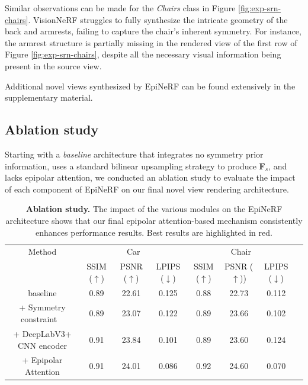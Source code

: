 Similar observations can be made for the \textit{Chairs} class in Figure \ref{fig:exp-srn-chairs}. VisionNeRF struggles to fully synthesize the intricate geometry of the back and armrests, failing to capture the chair's inherent symmetry. For instance, the armrest structure is partially missing in the rendered view of the first row of Figure \ref{fig:exp-srn-chairs}, despite all the necessary visual information being present in the source view. \newline

Additional novel views synthesized by EpiNeRF can be found extensively in the supplementary material.

\subsection{Ablation study}
Starting with a \textit{baseline} architecture that integrates no symmetry prior information, uses a standard bilinear upsampling strategy to produce $\mathbf{F}_{s}$, and lacks epipolar attention, we conducted an ablation study to evaluate the impact of each component of EpiNeRF on our final novel view rendering architecture.

\begin{table}[htp!]
\caption{\textbf{Ablation study.} The impact of the various modules on the EpiNeRF architecture shows that our final epipolar attention-based mechanism consistently enhances performance results. Best results are highlighted in \colorbox{red!25}{red}.}
\label{tab:ablation}
\begin{center}
\centering
\begin{adjustbox}{width=.5\textwidth}
\begin{tabular}[h]{c||ccccccc}
\hline
Method & \multicolumn{3}{c}{Car} & \multicolumn{3}{c}{Chair} \\
 &  SSIM ($\uparrow$) & PSNR ($\uparrow$) & LPIPS ($\downarrow$) & SSIM ($\uparrow$) & PSNR ($\uparrow$)) & LPIPS ($\downarrow$)\\[.5pt]
\hline
baseline & 0.89 & 22.61 & 0.125 & 0.88 & 22.73 & 0.112  \\[1.5pt]
\hline 
+ Symmetry constraint ~\cite{li2022symmnerf}  & 0.89 & 23.07  & 0.122 & 0.89 & 23.66 & 0.102 \\
+ DeepLabV3+ CNN encoder  & 0.91 & 23.84 & 0.101 & 0.89 & 23.60  & 0.124  \\
+ Epipolar Attention  & \cellcolor{red!25}0.91 & \cellcolor{red!25}24.01 &\cellcolor{red!25}0.086 & \cellcolor{red!25}0.92 &  \cellcolor{red!25}24.60 &\cellcolor{red!25}0.070 \\
\hline 
\end{tabular}
\end{adjustbox}
\end{center}

\end{table}


